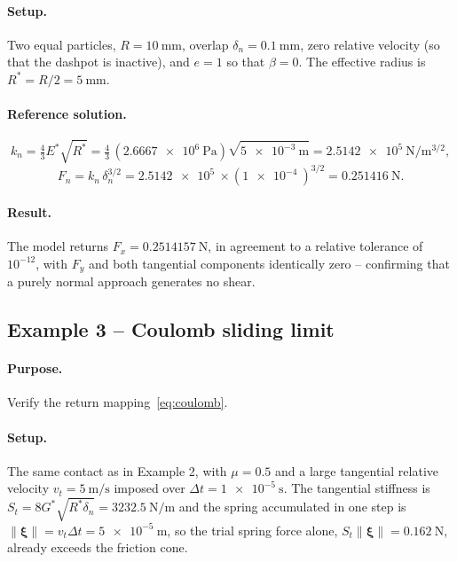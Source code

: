 \paragraph{Setup.}  Two equal particles, $R=\qty{10}{\milli\metre}$, overlap
$\delta_{n}=\qty{0.1}{\milli\metre}$, zero relative velocity (so that the
dashpot is inactive), and $e=1$ so that $\beta=0$.  The effective radius is
$R^{*}=R/2=\qty{5}{\milli\metre}$.

\paragraph{Reference solution.}
\begin{equation}
  k_{n} = \tfrac{4}{3}E^{*}\sqrt{R^{*}}
        = \tfrac{4}{3}\,(\qty{2.6667e6}{\pascal})\sqrt{\qty{5e-3}{\metre}}
        = \qty{2.5142e5}{\newton\per\metre^{3/2}},
\end{equation}
\begin{equation}
  F_{n} = k_{n}\,\delta_{n}^{3/2}
        = \qty{2.5142e5}{} \times (\qty{1e-4}{})^{3/2}
        = \qty{0.251416}{\newton} .
\end{equation}

\paragraph{Result.}  The model returns $F_{x}=\qty{0.2514157}{\newton}$, in
agreement to a relative tolerance of $10^{-12}$, with $F_{y}$ and both
tangential components identically zero -- confirming that a purely normal
approach generates no shear.

\subsection{Example 3 -- Coulomb sliding limit}

\paragraph{Purpose.}  Verify the return mapping~\eqref{eq:coulomb}.

\paragraph{Setup.}  The same contact as in Example 2, with $\mu=0.5$ and a
large tangential relative velocity $v_{t}=\qty{5}{\metre\per\second}$ imposed
over $\Delta t=\qty{1e-5}{\second}$.  The tangential stiffness is
$S_{t}=8G^{*}\sqrt{R^{*}\delta_{n}}=\qty{3232.5}{\newton\per\metre}$ and the
spring accumulated in one step is
$\lVert\boldsymbol{\xi}\rVert=v_{t}\Delta t=\qty{5e-5}{\metre}$, so the trial
spring force alone,
$S_{t}\lVert\boldsymbol{\xi}\rVert=\qty{0.162}{\newton}$, already exceeds the
friction cone.

